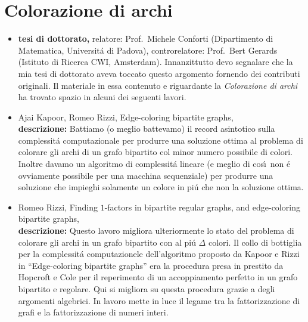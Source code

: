 \documentclass[10pt]{article}
\begin{document}
\section{Colorazione di archi}

\begin{itemize}
  \vspace{1.4mm}
  \item[] {\bf tesi di dottorato,}
          relatore: {\sc Prof.~Michele Conforti}
          (Dipartimento di Matematica, Universit\'a di Padova),
          controrelatore: {\sc Prof.~Bert Gerards}
          (Istituto di Ricerca CWI, Amsterdam).
          Innanzittutto devo segnalare che la
          mia tesi di dottorato aveva toccato questo argomento
          fornendo dei contributi originali.
          Il materiale in essa contenuto e riguardante
          la {\em Colorazione di archi} ha trovato
          spazio in alcuni dei seguenti lavori.\\

  \vspace{1.4mm}
  \item[] {\sc Ajai Kapoor, Romeo Rizzi},
   \newblock  Edge-coloring bipartite graphs,
   \\
{\bf descrizione:}
Battiamo (o meglio battevamo)
il record asintotico
sulla complessit\'a computazionale
per produrre una soluzione ottima al
problema di colorare gli archi di un grafo
bipartito col minor numero possibile di colori.
Inoltre davamo un algoritmo di complessit\'a lineare
(e meglio di cos\'\i\ non \'e ovviamente possibile
per una macchina sequenziale)
per produrre una soluzione
che impieghi solamente un colore in pi\'u
che non la soluzione ottima.\\

  \vspace{1.4mm}
  \item[] {\sc Romeo Rizzi},
   \newblock  Finding $1$-factors in bipartite regular graphs,
              and edge-coloring bipartite graphs,
    \\
{\bf descrizione:}
Questo lavoro migliora ulteriormente
lo stato del problema di colorare gli archi in un grafo
bipartito con al pi\'u $\Delta$ colori.
Il collo di bottiglia per la complessit\'a
computazionele dell'algoritmo proposto
da Kapoor
e Rizzi in ``Edge-coloring bipartite graphs''
era la procedura presa in prestito da Hopcroft e Cole
per il reperimento di un accoppiamento perfetto
in un grafo bipartito e regolare.
Qui si migliora su questa procedura
grazie a degli argomenti algebrici.
In lavoro mette in luce il legame tra
la fattorizzazione di grafi e la fattorizzazione
di numeri interi.\\


\end{itemize}
\end{document}
